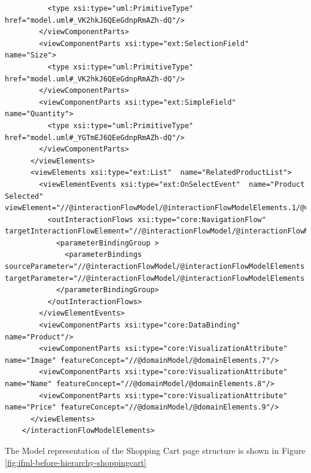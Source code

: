 \begin{lstlisting}
          <type xsi:type="uml:PrimitiveType" href="model.uml#_VK2hkJ6QEeGdnpRmAZh-dQ"/>
        </viewComponentParts>
        <viewComponentParts xsi:type="ext:SelectionField"  name="Size">
          <type xsi:type="uml:PrimitiveType" href="model.uml#_VK2hkJ6QEeGdnpRmAZh-dQ"/>
        </viewComponentParts>
        <viewComponentParts xsi:type="ext:SimpleField"  name="Quantity">
          <type xsi:type="uml:PrimitiveType" href="model.uml#_YGTmEJ6QEeGdnpRmAZh-dQ"/>
        </viewComponentParts>
      </viewElements>
      <viewElements xsi:type="ext:List"  name="RelatedProductList">
        <viewElementEvents xsi:type="ext:OnSelectEvent"  name="Product Selected" viewElement="//@interactionFlowModel/@interactionFlowModelElements.1/@viewElements.2">
          <outInteractionFlows xsi:type="core:NavigationFlow"  targetInteractionFlowElement="//@interactionFlowModel/@interactionFlowModelElements.1">
            <parameterBindingGroup >
              <parameterBindings  sourceParameter="//@interactionFlowModel/@interactionFlowModelElements.0/@viewElements.2/@parameters.0" targetParameter="//@interactionFlowModel/@interactionFlowModelElements.1/@parameters.0"/>
            </parameterBindingGroup>
          </outInteractionFlows>
        </viewElementEvents>
        <viewComponentParts xsi:type="core:DataBinding"  name="Product"/>
        <viewComponentParts xsi:type="core:VisualizationAttribute"  name="Image" featureConcept="//@domainModel/@domainElements.7"/>
        <viewComponentParts xsi:type="core:VisualizationAttribute"  name="Name" featureConcept="//@domainModel/@domainElements.8"/>
        <viewComponentParts xsi:type="core:VisualizationAttribute"  name="Price" featureConcept="//@domainModel/@domainElements.9"/>
      </viewElements>
    </interactionFlowModelElements>
\end{lstlisting}

\newpage
The Model representation of the Shopping Cart page structure is shown in Figure \ref{fig:ifml-before-hierarchy-shoppingcart}

